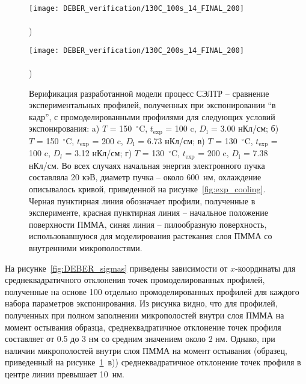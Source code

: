 \begin{figure}[h!]
	\begin{minipage}{0.48\textwidth}
		\texttt{[image: DEBER\_verification/130C\_100s\_14\_FINAL\_200]} \\
		\vspace{-13em} \\ ) \\ \vspace{13em}
	\end{minipage}
	\begin{minipage}{0.48\textwidth}
		\texttt{[image: DEBER\_verification/130C\_200s\_14\_FINAL\_200]} \\
		\vspace{-13em} \\ ) \\ \vspace{13em}
	\end{minipage}
	\vspace{-3em}
	\caption{Верификация разработанной модели процесс СЭЛТР -- сравнение экспериментальных профилей, полученных при экспонировании \linebreak ``в кадр'', с промоделированными профилями для следующих условий экспонирования: a) $T$ = 150~$^\circ$C, $t_\mathrm{exp}$ = 100 c, $D_\mathrm{l}$ = 3.00 нКл/см; б) $T$ = 150~$^\circ$C, $t_\mathrm{exp}$ = 200 c, $D_\mathrm{l}$ = 6.73 нКл/см; в) $T$ = 130~$^\circ$C, $t_\mathrm{exp}$ = 100 c, $D_l$ = 3.12 нКл/см; \linebreak г) $T$ = 130~$^\circ$C, $t_\mathrm{exp}$ = 200 c, $D_\mathrm{l}$ = 7.38 нКл/см. Во всех случаях начальная энергия электронного пучка составляла 20 кэВ, диаметр пучка -- около 600~нм, охлаждение описывалось кривой, приведенной на рисунке~\ref{fig:exp_cooling}. Черная пунктирная линия обозначает профили, полученные в эксперименте, красная пунктирная линия -- начальное положение поверхности ПММА, синяя линия -- пилообразную поверхность, использовавшуюся для моделирования растекания слоя ПММА со внутренними микрополостями.}
	\label{fig:DEBER_4_profiles}
	\vspace{1em}
\end{figure}

На рисунке~\ref{fig:DEBER_sigmas} приведены зависимости от $x$-координаты для среднеквадратичного отклонения точек промоделированных профилей, полученные на основе 100 отдельно промоделированных профилей для каждого набора параметров экспонирования. Из рисунка видно, что для профилей, полученных при полном заполнении микрополостей внутри слоя ПММА на момент остывания образца, среднеквадратичное отклонение точек профиля составляет от 0.5 до 3 нм со средним значением около 2 нм. Однако, при наличии микрополостей внутри слоя ПММА на момент остывания (образец, приведенный на рисунке~\ref{fig:DEBER_4_profiles}~в)) среднеквадратичное отклонение точек профиля в центре линии превышает 10~нм.

